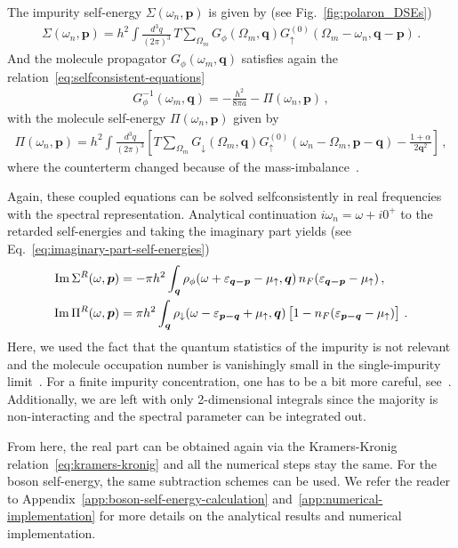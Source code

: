 The impurity self-energy $\Sigma(\omega_n, \bm{p})$ is given by (see Fig.~\ref{fig:polaron_DSEs})
%
\begin{align}
	\label{eq:self}
    \Sigma(\omega_n, \bm{p})
    = h^2 \int\frac{d^{3}q}{(2\pi)^{3}}\, T\sum_{\Omega_m}
    G_{\phi}(\Omega_m, \bm{q})
    G^{(0)}_{\uparrow}(\Omega_m-\omega_n, \bm{q-p}) \,.
\end{align}
%
And the molecule propagator $G_{\phi}(\omega_m, \bm{q})$ satisfies again the relation~\eqref{eq:selfconsistent-equations}
%
\begin{align}
	\label{eq:mol}
    G^{-1}_{\phi}(\omega_m, \bm{q}) = -\frac{h^2}{8\pi a} - \Pi(\omega_n,\bm{p}) \,,
\end{align}
%
with the molecule self-energy $\Pi(\omega_n,\bm{p})$ given by
%
\begin{align}
	\label{eq:pol}
    \Pi(\omega_n, \bm{p}) =
    h^2 \int\frac{d^{3}q}{(2\pi)^{3}}\left[ T\sum_{\Omega_m} G_{\downarrow}(\Omega_m, \bm{q}) G^{(0)}_{\uparrow}(\omega_n-\Omega_m, \bm{p-q}) - \frac{1+\alpha}{2\bm{q}^2} \right] \,,
\end{align}
%
where the counterterm changed because of the mass-imbalance~\cite{Hu2022}.

Again, these coupled equations can be solved selfconsistently in real frequencies with the spectral representation. Analytical continuation $i\omega_n = \omega + i0^+$ to the retarded self-energies and taking the imaginary part yields (see Eq.~\eqref{eq:imaginary-part-self-energies})
%
\begin{align}
	\label{eq:imaginary-part-polaron-self-energies}
	\mathrm{Im}\,\Sigma^R(\omega,\bm{p}) &= -\pi h^2\int_{\bm{q}}
	\rho_{\phi}(\omega+\varepsilon_{\bm{q-p}}-\mu_{\uparrow},\bm{q})
	\,n_F(\varepsilon_{\bm{q-p}}-\mu_{\uparrow}) \,, \notag \\
	\mathrm{Im}\,\Pi^R(\omega,\bm{p}) &= \pi h^2\int_{\bm{q}}
	\rho_{\downarrow}(\omega-\varepsilon_{\bm{p-q}}+\mu_{\uparrow},\bm{q})
	\left[1-n_F(\varepsilon_{\bm{p-q}}-\mu_{\uparrow})\right] \,.
\end{align}
%
Here, we used the fact that the quantum statistics of the impurity is not relevant and the molecule occupation number is vanishingly small in the single-impurity limit~\cite{Hu2022}. For a finite impurity concentration, one has to be a bit more careful, see~\cite{Hu2018,Tajima2019}. Additionally, we are left with only 2-dimensional integrals since the majority is non-interacting and the spectral parameter can be integrated out.

From here, the real part can be obtained again via the Kramers-Kronig relation~\eqref{eq:kramers-kronig} and all the numerical steps stay the same. For the boson self-energy, the same subtraction schemes can be used. We refer the reader to Appendix~\ref{app:boson-self-energy-calculation} and~\ref{app:numerical-implementation} for more details on the analytical results and numerical implementation.


